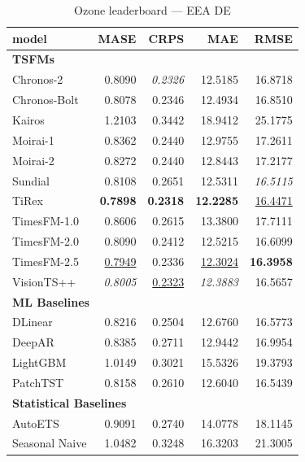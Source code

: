 \begin{table}[H]
\caption{Ozone leaderboard --- EEA DE}
\centering
\begin{small}
\begin{tabular}{lrrrr}
\toprule
model & MASE & CRPS & MAE & RMSE \\
\midrule
\multicolumn{5}{l}{\textbf{TSFMs}} \\
Chronos-2 & 0.8090 & \textit{0.2326} & 12.5185 & 16.8718 \\
Chronos-Bolt & 0.8078 & 0.2346 & 12.4934 & 16.8510 \\
Kairos & 1.2103 & 0.3442 & 18.9412 & 25.1775 \\
Moirai-1 & 0.8362 & 0.2440 & 12.9755 & 17.2611 \\
Moirai-2 & 0.8272 & 0.2440 & 12.8443 & 17.2177 \\
Sundial & 0.8108 & 0.2651 & 12.5311 & \textit{16.5115} \\
TiRex & \textbf{0.7898} & \textbf{0.2318} & \textbf{12.2285} & \underline{16.4471} \\
TimesFM-1.0 & 0.8606 & 0.2615 & 13.3800 & 17.7111 \\
TimesFM-2.0 & 0.8090 & 0.2412 & 12.5215 & 16.6099 \\
TimesFM-2.5 & \underline{0.7949} & 0.2336 & \underline{12.3024} & \textbf{16.3958} \\
VisionTS++ & \textit{0.8005} & \underline{0.2323} & \textit{12.3883} & 16.5657 \\
\midrule
\multicolumn{5}{l}{\textbf{ML Baselines}} \\
DLinear & 0.8216 & 0.2504 & 12.6760 & 16.5773 \\
DeepAR & 0.8385 & 0.2711 & 12.9442 & 16.9954 \\
LightGBM & 1.0149 & 0.3021 & 15.5326 & 19.3793 \\
PatchTST & 0.8158 & 0.2610 & 12.6040 & 16.5439 \\
\midrule
\multicolumn{5}{l}{\textbf{Statistical Baselines}} \\
AutoETS & 0.9091 & 0.2740 & 14.0778 & 18.1145 \\
Seasonal Naive & 1.0482 & 0.3248 & 16.3203 & 21.3005 \\
\bottomrule
\end{tabular}
\end{small}
\end{table}